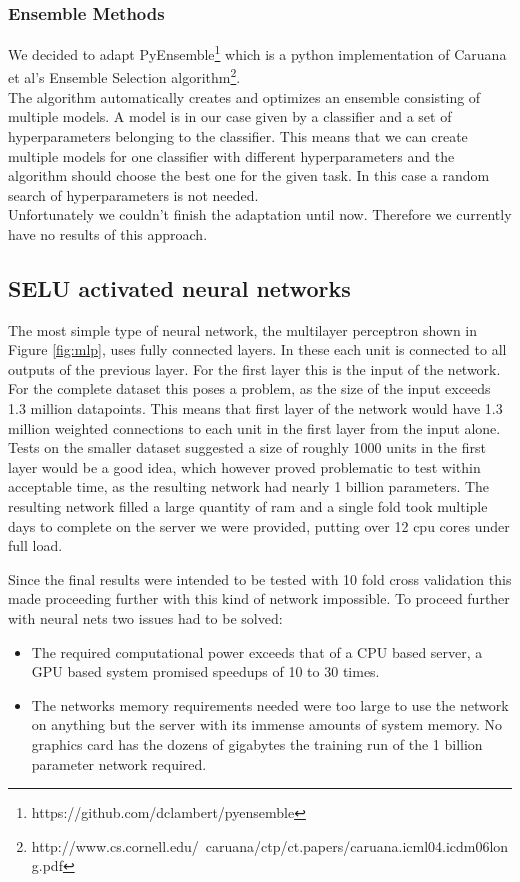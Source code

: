 \documentclass{article}
\begin{document}
\subsubsection*{Ensemble Methods}
We decided to adapt PyEnsemble\footnote{https://github.com/dclambert/pyensemble}
which is a python implementation of Caruana et al's Ensemble Selection
algorithm\footnote{http://www.cs.cornell.edu/~caruana/ctp/ct.papers/caruana.icml04.icdm06long.pdf}.
\\
The algorithm automatically creates and optimizes an ensemble consisting of
multiple models. A model is in our case given by a classifier and a set of
hyperparameters belonging to the classifier. This means that we can create
multiple models for one classifier with different hyperparameters and the
algorithm should choose the best one for the given task. In this case a random
search of hyperparameters is not needed. \\
Unfortunately we couldn't finish the adaptation until now. Therefore we
currently have no results of this approach.

\subsection*{SELU activated neural networks}

The most simple type of neural network, the multilayer perceptron shown in Figure \ref{fig:mlp}, uses fully connected layers. In these each unit is connected to all outputs of the previous layer. For the first layer this is the 
input of the network. For the complete dataset this poses a problem, as the size of the input exceeds 1.3 million datapoints. This means that first layer of the network would have 1.3 million weighted connections to each 
unit in the first layer from the input alone. Tests on the smaller dataset suggested a size of roughly 1000 units in the first layer would be a good idea, which however proved problematic to test within acceptable time, as 
the resulting network had nearly 1 billion parameters. The resulting network filled a large quantity of ram and a single fold took multiple days to complete on the server we were provided, 
putting over 12 cpu cores under full load.

Since the final results were intended to be tested with 10 fold cross validation this made proceeding further with this kind of network impossible. To proceed further with neural nets two issues had to be solved:

\begin{itemize}
 \item The required computational power exceeds that of a CPU based server, a GPU based system promised speedups of 10 to 30 times.
 \item The networks memory requirements needed were too large to use the network on anything but the server with its immense amounts of system memory. No graphics card has the dozens of gigabytes the training run of the 1
 billion parameter network required.
\end{itemize}
\end{document}
